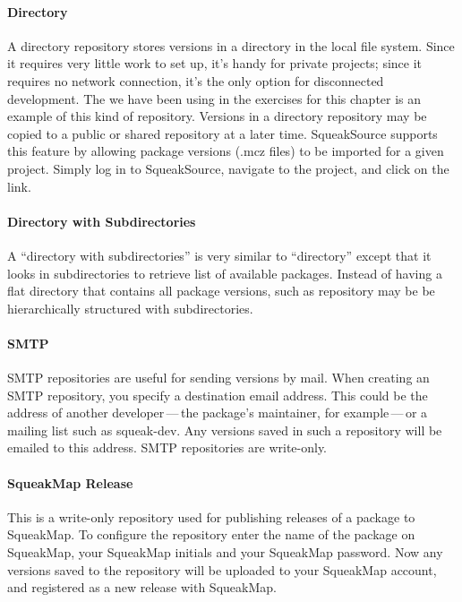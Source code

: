 \documentclass[a4paper,10pt,twoside]{book}
\begin{document}
\paragraph{Directory} A directory repository stores versions in a directory in the local file system. Since it requires very little work to set up, it's handy for private projects; since it requires no network connection, it's the only option for disconnected development. The  we have been using in the exercises for this chapter is an example of this kind of repository. Versions in a directory repository may be copied to a public or shared repository at a later time. SqueakSource supports this feature by allowing package versions (.mcz files) to be imported for a given project. Simply log in to SqueakSource, navigate to the project, and click on the  link.

\paragraph{Directory with Subdirectories}  A ``directory with subdirectories'' is very similar to ``directory'' except that it looks in subdirectories to retrieve list of available packages. Instead of having a flat directory that contains all package versions, such as repository may be be hierarchically  structured with  subdirectories.

\paragraph{SMTP} SMTP repositories are useful for sending versions by mail. When creating an SMTP repository, you specify a destination email address. This could be the address of another developer\,---\,the package's maintainer, for example\,---\,or a mailing list such as squeak-dev. Any versions saved in such a repository will be emailed to this address.  SMTP repositories are write-only.

\paragraph{SqueakMap Release} This is a write-only repository used for publishing releases of a package to SqueakMap. To configure the repository enter the name of the package on SqueakMap, your SqueakMap initials and your SqueakMap password. Now any versions saved to the repository will be uploaded to your SqueakMap account, and registered as a new release with SqueakMap.  
\end{document}

